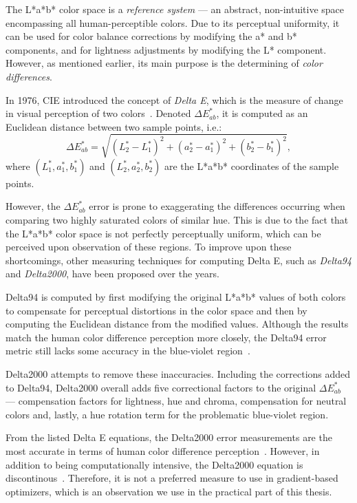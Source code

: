 The L*a*b* color space is a \emph{reference system} --- an abstract, non-intuitive space encompassing all human-perceptible colors. Due to its perceptual uniformity, it can be used for color balance corrections by modifying the a* and b* components, and for lightness adjustments by modifying the L* component. However, as mentioned earlier, its main purpose is the determining of \emph{color differences}.

In 1976, CIE introduced the concept of \emph{Delta E}, which is the measure of change in visual perception of two colors~\cite{deltaEOverview}. Denoted $\Delta E_{ab}^*$, it is computed as an Euclidean distance between two sample points, i.e.:
\begin{equation} \label{deltaE}
\Delta E_{ab}^*=\sqrt{(L_{2}^* - L_{1}^*)^2 + (a_{2}^* - a_{1}^*)^2 + (b_{2}^* - b_{1}^*)^2},
\end{equation}
where $(L_{1}^*,a_{1}^*,b_{1}^*)$ and $(L_{2}^*,a_{2}^*,b_{2}^*)$ are the L*a*b* coordinates of the sample points.

However, the $\Delta E_{ab}^*$ error is prone to exaggerating the differences occurring when comparing two highly saturated colors of similar hue. This is due to the fact that the L*a*b* color space is not perfectly perceptually uniform, which can be perceived upon observation of these regions. To improve upon these shortcomings, other measuring techniques for computing Delta E, such as \emph{Delta94} and \emph{Delta2000}, have been proposed over the years.

Delta94 is computed by first modifying the original L*a*b* values of both colors to compensate for perceptual distortions in the color space and then by computing the Euclidean distance from the modified values. Although the results match the human color difference perception more closely, the Delta94 error metric still lacks some accuracy in the blue-violet region~\cite{deltaEOverview}.
	
Delta2000 attempts to remove these inaccuracies. Including the corrections added to Delta94, Delta2000 overall adds five correctional factors to the original $\Delta E_{ab}^*$ --- compensation factors for lightness, hue and chroma, compensation for neutral colors and, lastly, a hue rotation term for the problematic blue-violet region.

From the listed Delta E equations, the Delta2000 error measurements are the most accurate in terms of human color difference perception~\cite{deltaEOverview}. However, in addition to being computationally intensive, the Delta2000 equation is discontinous~\cite{delta2000Discontinuities}. Therefore, it is not a preferred measure to use in gradient-based optimizers, which is an observation we use in the practical part of this thesis.

